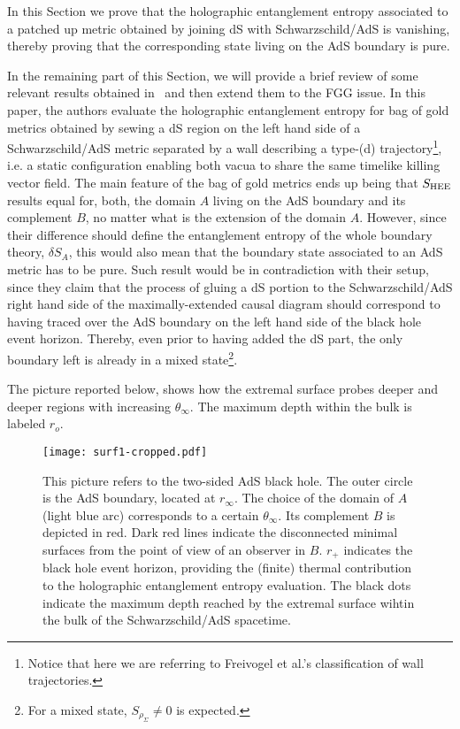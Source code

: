 \documentclass[11pt,a4paper]{article}
\begin{document}
In this Section we prove that the holographic entanglement entropy associated to a patched up metric obtained by joining dS with Schwarzschild/AdS is vanishing, thereby proving that the corresponding state living on the AdS boundary is pure. 

In the remaining part of this Section, we will provide a brief review of some relevant results obtained in~\cite{Hubeny} and then extend them to the FGG issue. In this paper, the authors evaluate the holographic entanglement entropy for bag of gold metrics obtained by sewing a dS region on the left hand side of a Schwarzschild/AdS metric separated by a wall describing a type-(d) trajectory\footnote{Notice that here we are referring to Freivogel et al.'s classification of wall trajectories.}, i.e. a static configuration enabling both vacua to share the same timelike killing vector field. The main feature of the bag of gold metrics ends up being that $S_{\rm HEE}$ results equal for, both, the domain $A$ living on the AdS boundary and its complement $B$, no matter what is the extension of the domain $A$. However, since their difference should define the entanglement entropy of the whole boundary theory, $\delta S_{A}$, this would also mean that the boundary state associated to an AdS metric has to be pure. Such result would be in contradiction with their setup, since they claim that the process of gluing a dS portion to the Schwarzschild/AdS right hand side of the maximally-extended causal diagram should correspond to having traced over the AdS boundary on the left hand side of the black hole event horizon. Thereby, even prior to having added the dS part, the only boundary left is already in a mixed state\footnote{For a mixed state, $S_{\rho_{\Sigma}}\neq0$ is expected.}.  

The picture reported below, shows how the extremal surface probes deeper and deeper regions with increasing $\theta_{\infty}$. The maximum depth within the bulk is labeled $r_{o}$.  

\begin{figure}[h!] 
\begin{center} 
\texttt{[image: surf1-cropped.pdf]} 
\caption{\footnotesize{This picture refers to the two-sided AdS black hole. The outer circle is the AdS boundary, located at $r_{\infty}$. The choice of the domain of $A$ (light blue arc) corresponds to a certain $\theta_{\infty}$. Its complement $B$ is depicted in red. Dark red lines indicate the disconnected minimal surfaces from the point of view of an observer in $B$. $r_{+}$ indicates the black hole event horizon, providing the (finite) thermal contribution to the holographic entanglement entropy evaluation. The black dots indicate the maximum depth reached by the extremal surface wihtin the bulk of the Schwarzschild/AdS spacetime.}} 
\end{center} 
\end{figure} 
\end{document}

